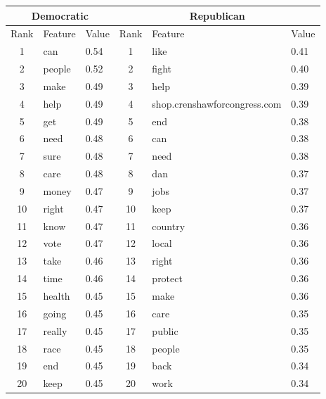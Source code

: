 \begin{tabular}{c|ll|c|ll}
     \hline
    \multicolumn{3}{c}{Democratic
    }&\multicolumn{3}{c}{Republican}\\ \hline
        Rank & Feature & Value & Rank & Feature & Value \\ \hline 
1 & can & 0.54 & 1 & like & 0.41 \\  
        2 & people & 0.52 & 2 & fight & 0.40 \\  
        3 & make & 0.49 & 3 & help & 0.39 \\  
        4 & help & 0.49 & 4 & shop.crenshawforcongress.com & 0.39 \\  
        5 & get & 0.49 & 5 & end & 0.38 \\  
        6 & need & 0.48 & 6 & can & 0.38 \\  
        7 & sure & 0.48 & 7 & need & 0.38 \\  
        8 & care & 0.48 & 8 & dan & 0.37 \\  
        9 & money & 0.47 & 9 & jobs & 0.37 \\  
        10 & right & 0.47 & 10 & keep & 0.37 \\  
        11 & know & 0.47 & 11 & country & 0.36 \\  
        12 & vote & 0.47 & 12 & local & 0.36 \\  
        13 & take & 0.46 & 13 & right & 0.36 \\  
        14 & time & 0.46 & 14 & protect & 0.36 \\  
        15 & health & 0.45 & 15 & make & 0.36 \\  
        16 & going & 0.45 & 16 & care & 0.35 \\  
        17 & really & 0.45 & 17 & public & 0.35 \\  
        18 & race & 0.45 & 18 & people & 0.35 \\  
        19 & end & 0.45 & 19 & back & 0.34 \\  
        20 & keep & 0.45 & 20 & work & 0.34 \\  \hline
\end{tabular}